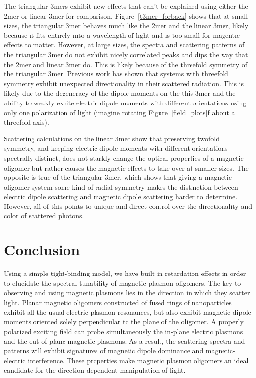 \documentclass[journal=apchd5,manuscript=article]{achemso}
\begin{document}
The triangular 3mers exhibit new effects that can't be explained using either the 2mer or linear 3mer for comparison. Figure~\ref{t3mer_forback} shows that at small sizes, the triangular 3mer behaves much like the 2mer and the linear 3mer, likely because it fits entirely into a wavelength of light and is too small for magentic effects to matter. However, at large sizes, the spectra and scattering patterns of the triangular 3mer do not exhibit nicely correlated peaks and dips the way that the 2mer and linear 3mer do. This is likely because of the threefold symmetry of the triangular 3mer. Previous work has shown that systems with threefold symmetry exhibit unexpected directionality in their scattered radiation.\cite{Tsutomu2017} This is likely due to the degeneracy of the dipole moments on the this 3mer and the ability to weakly excite electric dipole moments with different orientations using only one polarization of light (imagine rotating Figure~\ref{field_plots}f about a threefold axis).

Scattering calculations on the linear 3mer show that preserving twofold symmetry, and keeping electric dipole moments with different orientations spectrally distinct, does not starkly change the optical properties of a magnetic oligomer but rather causes the magnetic effects to take over at smaller sizes. The opposite is true of the triangular 3mer, which shows that giving a magnetic oligomer system some kind of radial symmetry makes the distinction between electric dipole scattering and magnetic dipole scattering harder to determine. However, all of this points to unique and direct control over the directionality and color of scattered photons.

\section{Conclusion}
Using a simple tight-binding model, we have built in retardation effects in order to elucidate the spectral tunability of magnetic plasmon oligomers. The key to observing and using magnetic plasmons lies in the direction in which they scatter light. Planar magnetic oligomers constructed of fused rings of nanoparticles exhibit all the usual electric plasmon resonances, but also exhibit magnetic dipole moments oriented solely perpendicular to the plane of the oligomer. A properly polarized exciting field can probe simultaneously the in-plane electric plasmons and the out-of-plane magnetic plasmons. As a result, the scattering spectra and patterns will exhibit signatures of magnetic dipole dominance and magnetic-electric interference. These properties make magnetic plasmon oligomers an ideal candidate for the direction-dependent manipulation of light.
\end{document}
